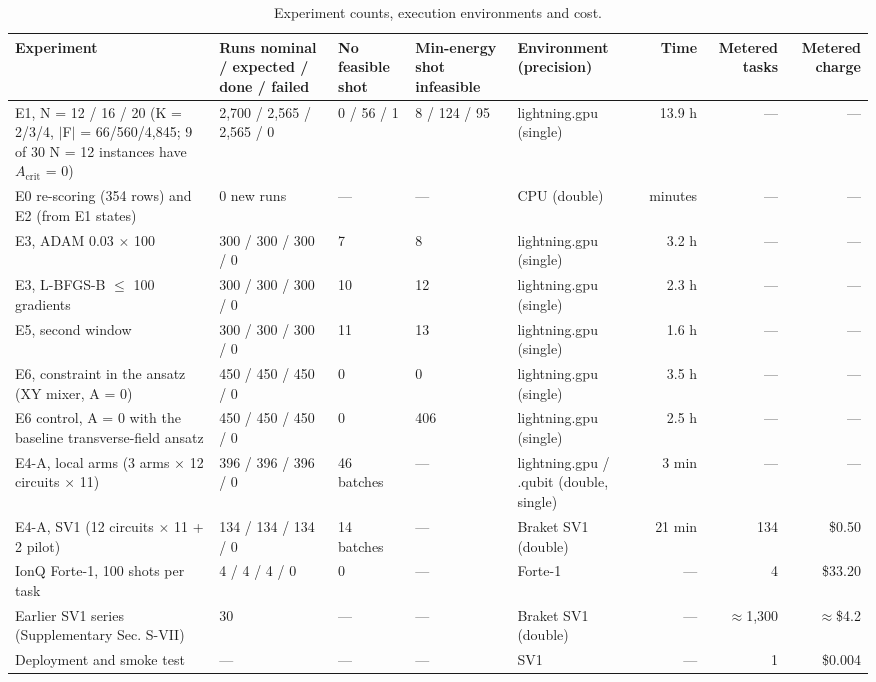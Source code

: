 \documentclass[journal]{IEEEtran}
\begin{document}
\begin{table}[!t]
\centering
\scriptsize
\caption{Experiment counts, execution environments and cost.}
\label{tab:II}
\begin{tabular}{p{}p{}p{}p{}p{}rrr}
\toprule
Experiment & Runs nominal / expected / done / failed & No feasible shot & Min-energy shot infeasible & Environment (precision) & Time & Metered tasks & Metered charge \\
\midrule
E1, N = 12 / 16 / 20 (K = 2/3/4, $|$F$|$ = 66/560/4,845; 9 of 30 N = 12 instances have $A_{\mathrm{crit}}$ = 0) & 2,700 / 2,565 / 2,565 / 0 & 0 / 56 / 1 & 8 / 124 / 95 & lightning.gpu (single) & 13.9 h & --- & --- \\
E0 re-scoring (354 rows) and E2 (from E1 states) & 0 new runs & --- & --- & CPU (double) & minutes & --- & --- \\
E3, ADAM 0.03 $\times$ 100 & 300 / 300 / 300 / 0 & 7 & 8 & lightning.gpu (single) & 3.2 h & --- & --- \\
E3, L-BFGS-B $\leq$ 100 gradients & 300 / 300 / 300 / 0 & 10 & 12 & lightning.gpu (single) & 2.3 h & --- & --- \\
E5, second window & 300 / 300 / 300 / 0 & 11 & 13 & lightning.gpu (single) & 1.6 h & --- & --- \\
E6, constraint in the ansatz (XY mixer, A = 0) & 450 / 450 / 450 / 0 & 0 & 0 & lightning.gpu (single) & 3.5 h & --- & --- \\
E6 control, A = 0 with the baseline transverse-field ansatz & 450 / 450 / 450 / 0 & 0 & 406 & lightning.gpu (single) & 2.5 h & --- & --- \\
E4-A, local arms (3 arms $\times$ 12 circuits $\times$ 11) & 396 / 396 / 396 / 0 & 46 batches & --- & lightning.gpu / .qubit (double, single) & 3 min & --- & --- \\
E4-A, SV1 (12 circuits $\times$ 11 + 2 pilot) & 134 / 134 / 134 / 0 & 14 batches & --- & Braket SV1 (double) & 21 min & 134 & \$0.50 \\
IonQ Forte-1, 100 shots per task & 4 / 4 / 4 / 0 & 0 & --- & Forte-1 & --- & 4 & \$33.20 \\
Earlier SV1 series (Supplementary Sec. S-VII) & 30 & --- & --- & Braket SV1 (double) & --- & $\approx$1,300 & $\approx$\$4.2 \\
Deployment and smoke test & --- & --- & --- & SV1 & --- & 1 & \$0.004 \\
\bottomrule
\end{tabular}
\end{table}
\end{document}
